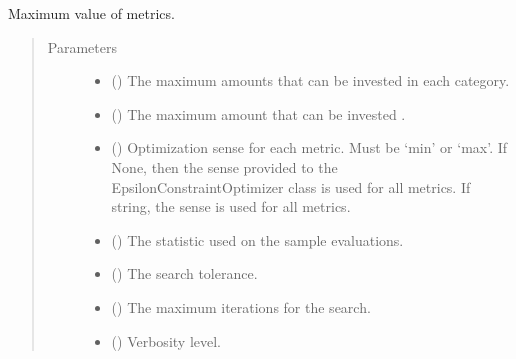 \documentclass[letterpaper,10pt,english]{sphinxmanual}
\begin{document}
\begin{fulllineitems}
\begin{fulllineitems}
\label{\detokenize{tyche:tyche.EpsilonConstraints.EpsilonConstraintOptimizer.optimum_metrics}}
Maximum value of metrics.
\begin{quote}\begin{description}
\item[{Parameters}] \leavevmode\begin{itemize}
\item {} 
 () \textendash{} The maximum amounts that can be invested in each category.

\item {} 
 () \textendash{} The maximum amount that can be invested .

\item {} 
 () \textendash{} Optimization sense for each metric. Must be ‘min’ or ‘max’. If None, then
the sense provided to the EpsilonConstraintOptimizer class is used for
all metrics. If string, the sense is used for all metrics.

\item {} 
 () \textendash{} The statistic used on the sample evaluations.

\item {} 
 () \textendash{} The search tolerance.

\item {} 
 () \textendash{} The maximum iterations for the search.

\item {} 
 () \textendash{} Verbosity level.

\end{itemize}

\end{description}\end{quote}

\end{fulllineitems}


\end{fulllineitems}
\end{document}
